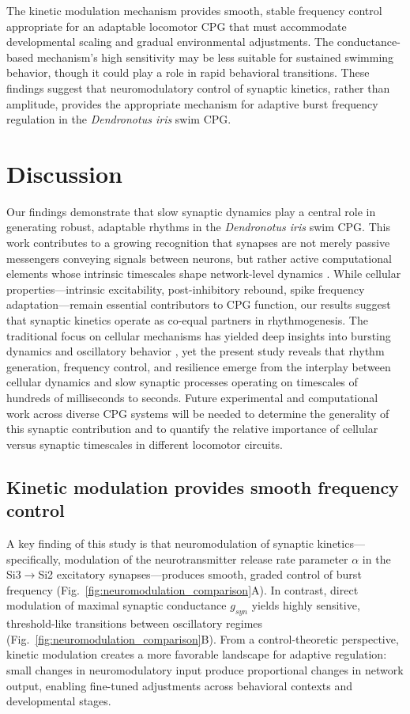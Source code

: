 \documentclass[nofootinbib,aip,amsmath,amssymb,preprint,twocolumn,floatfix,10pt]{revtex4-2}
\begin{document}
The kinetic modulation mechanism provides smooth, stable frequency control appropriate for an adaptable locomotor CPG that must accommodate developmental scaling and gradual environmental adjustments. The conductance-based mechanism's high sensitivity may be less suitable for sustained swimming behavior, though it could play a role in rapid behavioral transitions. These findings suggest that neuromodulatory control of synaptic kinetics, rather than amplitude, provides the appropriate mechanism for adaptive burst frequency regulation in the \textit{Dendronotus iris} swim CPG.

\section{Discussion}

Our findings demonstrate that slow synaptic dynamics play a central role in generating robust, adaptable rhythms in the \textit{Dendronotus iris} swim CPG. This work contributes to a growing recognition that synapses are not merely passive messengers conveying signals between neurons, but rather active computational elements whose intrinsic timescales shape network-level dynamics \cite{zucker2002short, Manor1997, NadimBucher2014}. While cellular properties---intrinsic excitability, post-inhibitory rebound, spike frequency adaptation---remain essential contributors to CPG function, our results suggest that synaptic kinetics operate as co-equal partners in rhythmogenesis. The traditional focus on cellular mechanisms has yielded deep insights into bursting dynamics and oscillatory behavior \cite{Rinzel87b, plant81}, yet the present study reveals that rhythm generation, frequency control, and resilience emerge from the interplay between cellular dynamics and slow synaptic processes operating on timescales of hundreds of milliseconds to seconds. Future experimental and computational work across diverse CPG systems will be needed to determine the generality of this synaptic contribution and to quantify the relative importance of cellular versus synaptic timescales in different locomotor circuits.

\subsection{Kinetic modulation provides smooth frequency control}

A key finding of this study is that neuromodulation of synaptic kinetics---specifically, modulation of the neurotransmitter release rate parameter $\alpha$ in the Si3$\to$Si2 excitatory synapses---produces smooth, graded control of burst frequency (Fig.~\ref{fig:neuromodulation_comparison}A). In contrast, direct modulation of maximal synaptic conductance $g_{syn}$ yields highly sensitive, threshold-like transitions between oscillatory regimes (Fig.~\ref{fig:neuromodulation_comparison}B). From a control-theoretic perspective, kinetic modulation creates a more favorable landscape for adaptive regulation: small changes in neuromodulatory input produce proportional changes in network output, enabling fine-tuned adjustments across behavioral contexts and developmental stages.
\end{document}
